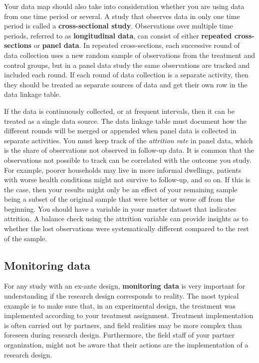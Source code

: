 Your data map should also take into consideration
whether you are using data from one time period or several.
A study that observes data in only one time period is called
a \textbf{cross-sectional study}.
Observations over multiple time periods,
referred to as \textbf{longitudinal data},
can consist of either
\textbf{repeated cross-sections}
or \textbf{panel data}.
In repeated cross-sections,
each successive round of data collection uses a new random sample
of observations from the treatment and control groups,
but in a panel data study
the same observations are tracked and included each round.
If each round of data collection is a separate activity,
then they should be treated as separate sources of data
and get their own row in the data linkage table.

If the data is continuously collected,
or at frequent intervals,
then it can be treated as a single data source.
The data linkage table must document
how the different rounds will be merged or appended
when panel data is collected in separate activities.
You must keep track of the \textit{attrition rate} in panel data,
which is the share of observations not observed in follow-up data.
It is common that the observations not possible to track
can be correlated with the outcome you study.
For example, poorer households may live in more informal dwellings,
patients with worse health conditions might not survive to follow-up,
and so on.
If this is the case,
then your results might only be an effect of your remaining sample
being a subset of the original sample
that were better or worse off from the beginning.
You should have a variable in your master dataset
 that indicates attrition.
A balance check using the attrition variable
can provide insights as to whether the lost observations
were systematically different
compared to the rest of the sample.

\subsection{Monitoring data}

For any study with an ex-ante design,
\textbf{monitoring data}
is very important for understanding if the
research design corresponds to reality.
The most typical example is to make sure that,
in an experimental design,
the treatment was implemented according to your treatment assignment.
Treatment implementation is often carried out by partners,
and field realities may be more complex than foreseen during research design.
Furthermore, the field staff of your partner organization,
might not be aware that their actions are the implementation of a research design.

